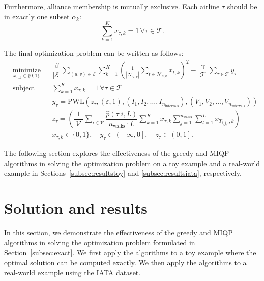 \documentclass[preprint,times]{elsarticle}
\def\mkhalil#1{{\color{black} #1}}
\begin{document}
\mkhalil{Furthermore, alliance membership is mutually exclusive.} Each \mkhalil{airline} $\tau$ should be in exactly one subset $\alpha_k$:
\begin{equation} \label{eq:constraint}
\sum_{k=1}^K x_{\tau, k} = 1 \, \forall \tau \in \mathcal{T}.
\end{equation}
%

The final optimization problem can be written as follows:
%
\begin{equation} \label{eq:finalopt}
\begin{aligned}
& \underset{x_{\tau, k} \in \{0, 1\}}{\text{minimize}}
& & \dfrac{\beta}{\left|\mathcal{E}\right|}\sum_{(u,v)\in\mathcal{E}}\sum_{k=1}^{K} \left( \frac{1}{|\mathcal{N}_{u,v}|} \sum_{t \in \mathcal{N}_{u,v}} x_{t, k} \right)^2 - \dfrac{\gamma}{\left|\mathcal{T}\right|}\sum_{\tau\in\mathcal{T}}y_{\tau} \\
& \text{subject to}
& & \sum_{k=1}^K x_{\tau, k} = 1 \, \forall \tau \in \mathcal{T} \\
& & & y_{\tau} = \text{PWL}(z_{\tau}, (\varepsilon, 1), (I_1, I_2, \ldots, I_{n_\text{intervals}}), (V_1, V_2, \ldots, V_{n_\text{intervals}})) \\
& & & z_{\tau} = \left(\dfrac{1}{\left|\mathcal{V}\right|}\sum_{i\in\mathcal{V}}\dfrac{\hat{p}(\tau|i,L)}{n_\text{walks}\cdot L}\sum_{k=1}^{K}x_{\tau,k}\sum_{j=1}^{n_\text{walks}}\sum_{l=1}^{L}x_{T_{i,j,l},k}\right) \\
& & & x_{\tau, k} \in \{0, 1\}, \quad y_{\tau} \in \left(-\infty,0\right], \quad z_{\tau} \in \left(0,1\right].
\end{aligned}
\end{equation}

The following section explores the effectiveness of the greedy and \ac{MIQP} algorithms in solving the optimization problem on a toy example and a real-world example in Sections~\ref{subsec:resultstoy} and \ref{subsec:resultsiata}, respectively.

\section{Solution and results} \label{sec:results}

In this section, we demonstrate the effectiveness of the greedy and \ac{MIQP} algorithms in solving the optimization problem formulated in Section~\ref{subsec:exact}. We first apply the algorithms to a toy example where the optimal solution can be computed exactly. We then apply the algorithms to a real-world example using the \ac{IATA} dataset.
\end{document}
